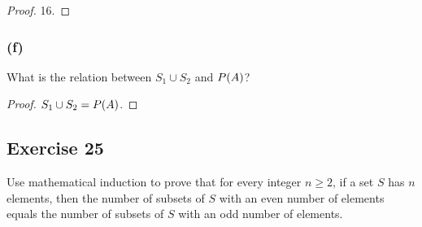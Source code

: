\documentclass[14pt]{extarticle}
\let\mathscr\relax
\newcommand{\ps}{\mathscr{P}}
\begin{document}
\begin{proof}
16.
\end{proof}

\subsubsection{(f)}
What is the relation between \(S_1 \cup S_2\) and \(\ps(A)\)?

\begin{proof}
\(S_1 \cup S_2 = \ps(A)\).
\end{proof}

\subsection{Exercise 25}
Use mathematical induction to prove that for every integer $n \geq 2$, if a set $S$ has $n$ elements, then the number 
of subsets of $S$ with an even number of elements equals the number of subsets of $S$ with an odd number of elements.
\end{document}
